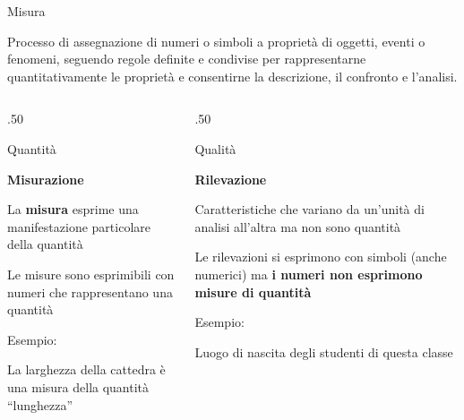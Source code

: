 \documentclass[compress]{beamer}
\begin{document}
\begin{frame}

\vspace{-5mm}
\begin{block}{Misura}

Processo di assegnazione di numeri o simboli a proprietà di oggetti, eventi o fenomeni, seguendo regole definite e condivise per rappresentarne quantitativamente le proprietà e consentirne la descrizione, il confronto e l’analisi.

\end{block}

\vspace{-2mm}

\begin{columns}[T]
\begin{column}{.50\linewidth}
\begin{center}
Quantità
\end{center}
\small 

\textbf{Misurazione}
			
La \textbf{misura} esprime una manifestazione particolare della quantità
			
Le misure sono esprimibili con numeri che rappresentano una quantità
			
\begin{block}{Esempio:}

\small				
La larghezza della cattedra è una misura della quantità ``lunghezza''
\end{block}
\end{column}

\begin{column}{.50\linewidth}
\begin{center}
Qualità
\end{center}
\small
			
\textbf{Rilevazione}
			
Caratteristiche che variano da un'unità di analisi all'altra ma non sono quantità 
			
Le rilevazioni si esprimono con simboli (anche numerici) ma \textbf{i numeri non esprimono misure di quantità}
			
\begin{block}{Esempio:}

\small				
Luogo di nascita degli studenti di questa classe
\end{block}
\end{column}
\end{columns}
\end{frame}
\end{document}
